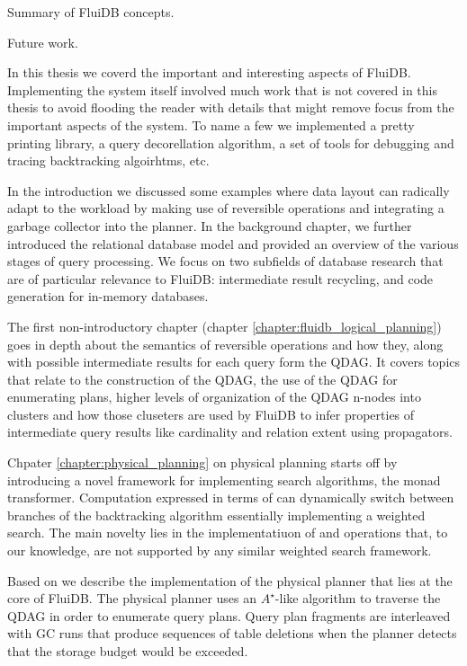 
\begin{summary}
\item Summary of FluiDB concepts.
\item Future work.
\end{summary}


In this thesis we coverd the important and interesting aspects of
FluiDB. Implementing the system itself involved much work that is not
covered in this thesis to avoid flooding the reader with details that
might remove focus from the important aspects of the system. To name a
few we implemented a pretty printing library, a query decorellation
algorithm, a set of tools for debugging and tracing backtracking
algoirhtms, etc.

In the introduction we discussed some examples where data layout can
radically adapt to the workload by making use of reversible operations
and integrating a garbage collector into the planner. In the
background chapter, we further introduced the relational database
model and provided an overview of the various stages of query
processing. We focus on two subfields of database research that are of
particular relevance to FluiDB: intermediate result recycling, and
code generation for in-memory databases.

The first non-introductory chapter (chapter
\ref{chapter:fluidb_logical_planning}) goes in depth about the
semantics of reversible operations and how they, along with possible
intermediate results for each query form the QDAG. It covers topics
that relate to the construction of the QDAG, the use of the QDAG for
enumerating plans, higher levels of organization of the QDAG n-nodes
into clusters and how those cluseters are used by FluiDB to infer
properties of intermediate query results like cardinality and relation
extent using propagators.

Chpater \ref{chapter:physical_planning} on physical planning starts
off by introducing a novel framework for implementing search
algorithms, the  monad transformer. Computation expressed
in terms of  can dynamically switch between branches of
the backtracking algorithm essentially implementing a weighted
search. The main novelty lies in the implementatiuon of 
and  operations that, to our knowledge, are not
supported by any similar weighted search framework.

Based on  we describe the implementation of the physical
planner that lies at the core of FluiDB. The physical planner uses an
\(A^{\star}\)-like algorithm to traverse the QDAG in order to
enumerate query plans. Query plan fragments are interleaved with GC
runs that produce sequences of table deletions when the planner
detects that the storage budget would be exceeded.

